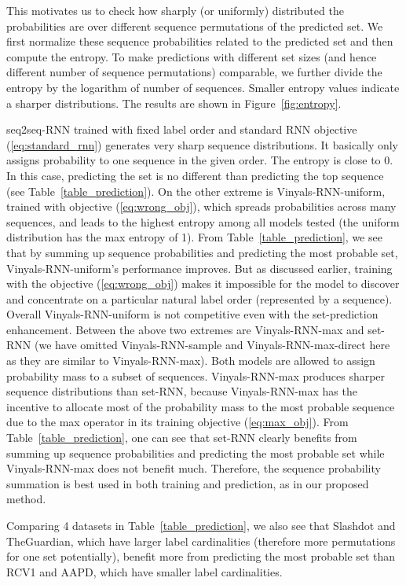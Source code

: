 This motivates us to check how sharply (or uniformly) distributed the probabilities are over different sequence permutations of the predicted set. We first normalize these sequence probabilities related to the predicted set and then compute the entropy. To make predictions with different set sizes (and hence different number of sequence permutations) comparable, we further divide the entropy by the logarithm of number of sequences. Smaller entropy values indicate a sharper distributions. The results are shown in Figure~\ref{fig:entropy}.

seq2seq-RNN trained with fixed label order and standard RNN objective (\ref{eq:standard_rnn}) generates very sharp sequence distributions. It basically only assigns probability to one sequence in the given order. The entropy is close to 0. In this case, predicting the set is no different than predicting the top sequence (see Table~\ref{table_prediction}). On the other extreme is Vinyals-RNN-uniform, trained with objective (\ref{eq:wrong_obj}), which spreads probabilities across many sequences, and leads to the highest entropy among all models tested (the uniform distribution has the max entropy of 1). From Table~\ref{table_prediction}, we see that by summing up sequence probabilities and predicting the most probable set,  Vinyals-RNN-uniform's performance  improves. But as  discussed earlier, training with the objective (\ref{eq:wrong_obj}) makes it impossible for the model to discover and concentrate on a particular natural label order (represented by a sequence). Overall Vinyals-RNN-uniform is not competitive even with the set-prediction enhancement. Between the above two extremes are Vinyals-RNN-max and set-RNN (we have omitted Vinyals-RNN-sample and Vinyals-RNN-max-direct here as they are similar to Vinyals-RNN-max). Both models are allowed to assign probability mass to a subset of sequences. Vinyals-RNN-max produces sharper sequence distributions than set-RNN, because  Vinyals-RNN-max has the incentive to allocate most of the probability mass to the most probable sequence due to the max operator in its training objective (\ref{eq:max_obj}). From Table~\ref{table_prediction}, one can see that set-RNN clearly benefits from summing up sequence probabilities and predicting the most probable set while Vinyals-RNN-max does not benefit much. Therefore, the sequence probability summation is best used in both training and prediction, as in our proposed method.

Comparing 4 datasets in Table~\ref{table_prediction}, we also see that Slashdot and TheGuardian, which have larger label cardinalities (therefore more permutations for one set potentially), benefit more from predicting the most probable set than RCV1 and AAPD, which have smaller label cardinalities.

